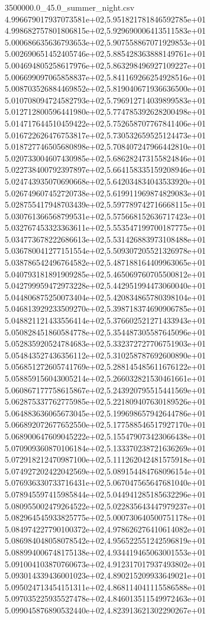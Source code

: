 \begin{filecontents*}{3500000.0_45.0_summer_night.csv}
4.996679017937073581e+02,5.951821781846592785e+01
4.998682757801806815e+02,5.929690006413511583e+01
5.000686635636793653e+02,5.907558867071929853e+01
5.002690651452405746e+02,5.885428363888149761e+01
5.004694805258617976e+02,5.863298496927109227e+01
5.006699097065858837e+02,5.841169266254928516e+01
5.008703526884469852e+02,5.819040671936636500e+01
5.010708094724582793e+02,5.796912714039899583e+01
5.012712800596441980e+02,5.774785392628200498e+01
5.014717644510459422e+02,5.752658707767841406e+01
5.016722626476753817e+02,5.730532659525124473e+01
5.018727746505680898e+02,5.708407247966442810e+01
5.020733004607430985e+02,5.686282473155824846e+01
5.022738400792397897e+02,5.664158335159208946e+01
5.024743935070690668e+02,5.642034834043533920e+01
5.026749607452720738e+02,5.619911969874829083e+01
5.028755417948703439e+02,5.597789742716668115e+01
5.030761366568799531e+02,5.575668152636717423e+01
5.032767453323363611e+02,5.553547199700187775e+01
5.034773678222686613e+02,5.531426883973108488e+01
5.036780041277151554e+02,5.509307205521326978e+01
5.038786542496764582e+02,5.487188164409963065e+01
5.040793181891909285e+02,5.465069760705500812e+01
5.042799959472973228e+02,5.442951994473060040e+01
5.044806875250073404e+02,5.420834865780398104e+01
5.046813929233509270e+02,5.398718374690906785e+01
5.048821121433556414e+02,5.376602521271433943e+01
5.050828451860584778e+02,5.354487305587645096e+01
5.052835920524784683e+02,5.332372727706751903e+01
5.054843527436356112e+02,5.310258787692600890e+01
5.056851272605741769e+02,5.288145485611676122e+01
5.058859156043005214e+02,5.266032821530461661e+01
5.060867177758615867e+02,5.243920795515441569e+01
5.062875337762775985e+02,5.221809407630189526e+01
5.064883636065673045e+02,5.199698657942644786e+01
5.066892072677652550e+02,5.177588546517927170e+01
5.068900647609045222e+02,5.155479073423066438e+01
5.070909360870106184e+02,5.133370238721636269e+01
5.072918212470987100e+02,5.111262042481575918e+01
5.074927202422042569e+02,5.089154484768096154e+01
5.076936330733716431e+02,5.067047565647681040e+01
5.078945597415985844e+02,5.044941285185632296e+01
5.080955002479264522e+02,5.022835643447979237e+01
5.082964545933825775e+02,5.000730640500751178e+01
5.084974227790100372e+02,4.978626276410614082e+01
5.086984048058078542e+02,4.956522551242596819e+01
5.088994006748175138e+02,4.934419465063001553e+01
5.091004103870760673e+02,4.912317017937493802e+01
5.093014339436001023e+02,4.890215209933649021e+01
5.095024713454151311e+02,4.868114041115586588e+01
5.097035225935527478e+02,4.846013511549972463e+01
5.099045876890532440e+02,4.823913621302290267e+01

\end{filecontents*}
